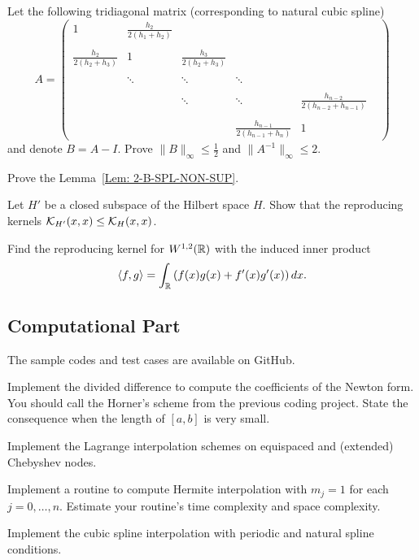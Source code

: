 \begin{problem}
    Let the following tridiagonal matrix (corresponding to natural cubic spline)
    $$A = \begin{pmatrix}
        1 & \frac{h_{2}}{2(h_1 + h_{2})} & \\\\
        \frac{h_2}{2(h_2 + h_{3})} & 1 & \frac{h_{3}}{2(h_2 + h_{3})} & \\\\
        &\ddots &\ddots &  \ddots & \\ \\
        &&\ddots &\ddots &  \frac{h_{n-2}}{2(h_{n-2} + h_{n-1})} & \\ \\
        &&& \frac{h_{n-1}}{2(h_{n-1} + h_{n})} & 1&
    \end{pmatrix} $$
    and denote $B = A - I$. Prove $\|B\|_{\infty} \le \frac{1}{2}$ and $\|A^{-1}\|_{\infty}\le 2$. 
\end{problem}
\begin{problem}
\label{Prb: 2-B-SPL-NON-SUP}
    Prove the Lemma~\ref{Lem: 2-B-SPL-NON-SUP}.
\end{problem}
\begin{problem}
\label{Exer:2-Rep-Ker-Ine}
    Let $H'$ be a closed subspace of the Hilbert space $H$. Show that the reproducing kernels $\mathcal K_{H'}(x, x) \le \mathcal K_{H}(x, x)$. 
\end{problem}
\begin{problem}
    Find the reproducing kernel for $W^{1,2}(\mathbb R)$ with the induced inner product
    \begin{equation*}
        \langle {f, g} \rangle = \int_{\mathbb R} \left( f(x) {g(x)} + f'(x) {g'(x)} \right) dx. 
    \end{equation*}
\end{problem}
\subsection{Computational Part}
The sample codes and test cases are available on GitHub. 
\begin{problem}
    Implement the divided difference to compute the coefficients of the Newton form. You should call the Horner's scheme from the previous coding project. State the consequence when the length of $[a, b]$ is very small. 
\end{problem}
\begin{problem}
    Implement the Lagrange interpolation schemes on equispaced and (extended) Chebyshev nodes.
\end{problem}
\begin{problem}
    Implement a routine to compute Hermite interpolation with $m_j = 1$ for each $j = 0, \dots, n$. Estimate your routine's time complexity and space complexity. 
\end{problem}
\begin{problem}
    Implement the cubic spline interpolation with periodic and natural spline conditions. 
\end{problem}

